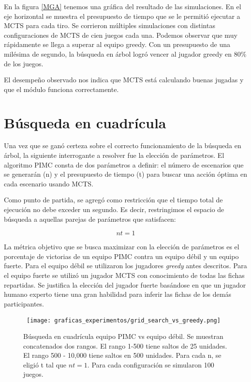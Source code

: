 En la figura \ref{MGA} tenemos una gráfica del resultado de las simulaciones. En
el eje horizontal se muestra el presupuesto de tiempo que se le permitió
ejecutar a MCTS para cada tiro. Se corrieron múltiples simulaciones con
distintas configuraciones de MCTS de cien juegos cada una. Podemos observar que
muy rápidamente se llega a superar al equipo greedy. Con un presupuesto de una
milésima de segundo, la búsqueda en árbol logró vencer al jugador greedy en 80\%
de los juegos.

El desempeño observado nos indica que MCTS está calculando buenas jugadas y que
el módulo funciona correctamente.


\section{Búsqueda en cuadrícula}

Una vez que se ganó certeza sobre el correcto funcionamiento de la búsqueda en
árbol, la siguiente interrogante a resolver fue la elección de parámetros. El
algoritmo PIMC consta de dos parámetros a definir: el número de escenarios que
se generarán (n) y el presupuesto de tiempo (t) para buscar una acción óptima en
cada escenario usando MCTS.

Como punto de partida, se agregó como restricción que el tiempo total de
ejecución no debe exceder un segundo. Es decir, restringimos el espacio de
búsqueda a aquellas parejas de parámetros que satisfacen:


\[nt = 1 \]

La métrica objetivo que se busca maximizar con la elección de parámetros es el
porcentaje de victorias de un equipo PIMC contra un equipo débil y un equipo
fuerte. Para el equipo débil se utilizaron los jugadores \textit{greedy} antes
descritos. Para el equipo fuerte se utilizó un jugador MCTS con conocimiento de
todas las fichas repartidas. Se justifica la elección del jugador fuerte
basándose en que un jugador humano experto tiene una gran habilidad para inferir
las fichas de los demás participantes.

\begin{figure}[H]
    \begin{center}
        \hbox{\hspace{-2em}
            \texttt{[image: graficas\_experimentos/grid\_search\_vs\_greedy.png]}}
        \caption{Búsqueda en cuadrícula equipo PIMC vs equipo débil. Se muestran
            concatenados dos rangos. El rango 1-500 tiene saltos de 25 unidades. El
            rango 500 - 10,000 tiene saltos en 500 unidades. Para cada n, se eligió
            t tal que \(nt = 1\). Para cada configuración se simularon 100 juegos.}
        \label{GSW}
    \end{center}
\end{figure}

